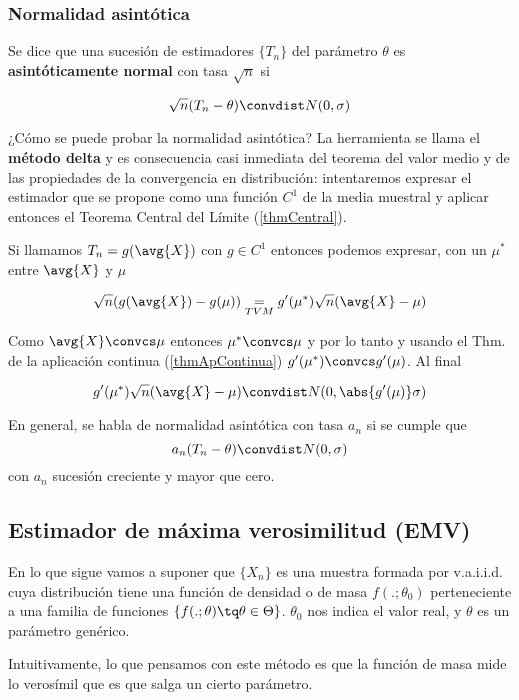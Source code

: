 \documentclass{apuntes}
\begin{document}
\subsubsection{Normalidad asintótica} Se dice que una sucesión de estimadores $\{T_n\}$ del parámetro $\theta$ es \textbf{asintóticamente normal} con tasa $\sqrt{n}$ si

\[ \sqrt{n} (T_n - \theta) \convdist N(0,\sigma) \]

¿Cómo se puede probar la normalidad asintótica? La herramienta se llama el \textbf{método delta}\label{defMetDelta}  y es consecuencia casi inmediata del teorema del valor medio y de las propiedades de la convergencia en distribución: intentaremos expresar el estimador que se propone como una función $C^1$ de la media muestral y aplicar entonces el Teorema Central del Límite (\ref{thmCentral}).

Si llamamos $T_n = g(\avg{X})$ con $g\in C^1$ entonces podemos expresar, con un $\mu^\ast$ entre $\avg{X}$ y $\mu$

\[ \sqrt{n} (g(\avg{X}) - g(\mu)) \underset{TVM}{=} g'(\mu^\ast) \sqrt{n}(\avg{X} -\mu) \]

Como $\avg{X}\convcs \mu$ entonces $\mu^\ast \convcs \mu$ y por lo tanto y usando el Thm. de la aplicación continua (\ref{thmApContinua}) $g'(\mu^\ast)\convcs g'(\mu)$. Al final

\[ g'(\mu^\ast) \sqrt{n}(\avg{X} -\mu) \convdist N(0, \abs{g'(\mu)}\sigma) \]

En general, se habla de normalidad asintótica con tasa $a_n$ si se cumple que \[ a_n (T_n - \theta) \convdist N(0,\sigma) \] con $a_n$ sucesión creciente y mayor que cero.

\subsection{Estimador de máxima verosimilitud (EMV)}

En lo que sigue vamos a suponer que $\{X_n\}$ es una muestra formada por v.a.i.i.d. cuya distribución tiene una función de densidad o de masa $f(.;\theta_0)$ perteneciente a una familia de funciones $\{f(.;\theta) \tq \theta \in \Theta\}$. $\theta_0$ nos indica el valor real, y $\theta$ es un parámetro genérico.

Intuitivamente, lo que pensamos con este método es que la función de masa mide lo verosímil que es que salga un cierto parámetro.
\end{document}
